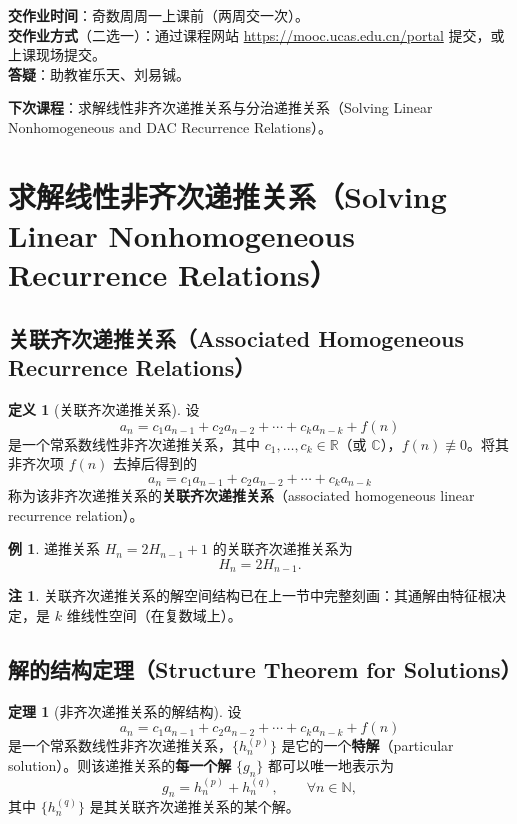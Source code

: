 \documentclass[UTF8,11pt,a4paper]{ctexbook}   %
\theoremstyle{definition}
\newtheorem{definition}{定义}[section]
\newtheorem{theorem}{定理}[section]
\newtheorem{example}{例}[section]
\newtheorem{remark}{注}[section]
\begin{document}
\textbf{交作业时间}：奇数周周一上课前（两周交一次）。\\
\textbf{交作业方式}（二选一）：通过课程网站 \url{https://mooc.ucas.edu.cn/portal} 提交，或上课现场提交。\\
\textbf{答疑}：助教崔乐天、刘易铖。

\textbf{下次课程}：求解线性非齐次递推关系与分治递推关系（Solving Linear Nonhomogeneous and DAC Recurrence Relations）。

\section{求解线性非齐次递推关系（Solving Linear Nonhomogeneous Recurrence Relations）}

\subsection{关联齐次递推关系（Associated Homogeneous Recurrence Relations）}

\begin{definition}[关联齐次递推关系]
设
\[
a_n = c_1 a_{n-1} + c_2 a_{n-2} + \cdots + c_k a_{n-k} + f(n)
\]
是一个常系数线性非齐次递推关系，其中 $c_1,\dots,c_k\in\mathbb{R}$（或 $\mathbb{C}$），$f(n)\not\equiv 0$。将其非齐次项 $f(n)$ 去掉后得到的
\[
a_n = c_1 a_{n-1} + c_2 a_{n-2} + \cdots + c_k a_{n-k}
\]
称为该非齐次递推关系的\textbf{关联齐次递推关系}（associated homogeneous linear recurrence relation）。
\end{definition}

\begin{example}
递推关系 $H_n = 2H_{n-1} + 1$ 的关联齐次递推关系为
\[
H_n = 2H_{n-1}.
\]
\end{example}

\begin{remark}
关联齐次递推关系的解空间结构已在上一节中完整刻画：其通解由特征根决定，是 $k$ 维线性空间（在复数域上）。
\end{remark}

\subsection{解的结构定理（Structure Theorem for Solutions）}

\begin{theorem}[非齐次递推关系的解结构]\label{thm:nonhom-structure}
设
\[
a_n = c_1 a_{n-1} + c_2 a_{n-2} + \cdots + c_k a_{n-k} + f(n)
\]
是一个常系数线性非齐次递推关系，$\{h_n^{(p)}\}$ 是它的一个\textbf{特解}（particular solution）。则该递推关系的\textbf{每一个解} $\{g_n\}$ 都可以唯一地表示为
\[
g_n = h_n^{(p)} + h_n^{(q)},\qquad \forall n\in\mathbb{N},
\]
其中 $\{h_n^{(q)}\}$ 是其关联齐次递推关系的某个解。
\end{theorem}
\end{document}
